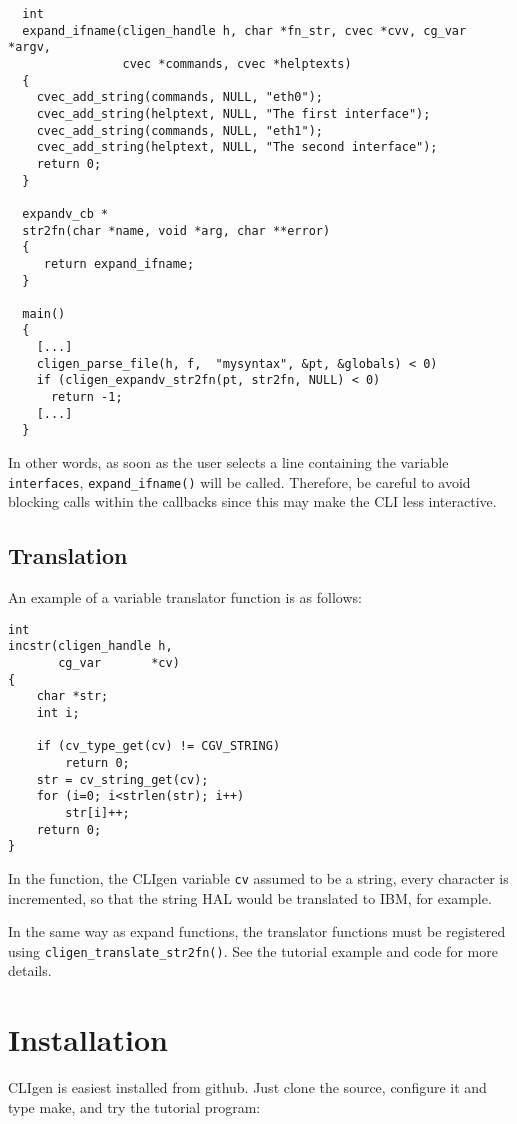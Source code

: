 \documentclass[a4paper, 10pt] {article}
\begin{document}
\begin{verbatim}
  int 
  expand_ifname(cligen_handle h, char *fn_str, cvec *cvv, cg_var *argv, 
                cvec *commands, cvec *helptexts)
  {
    cvec_add_string(commands, NULL, "eth0");
    cvec_add_string(helptext, NULL, "The first interface");
    cvec_add_string(commands, NULL, "eth1");
    cvec_add_string(helptext, NULL, "The second interface");
    return 0;
  }

  expandv_cb *
  str2fn(char *name, void *arg, char **error)
  {
     return expand_ifname;
  }

  main()
  {   
    [...]
    cligen_parse_file(h, f,  "mysyntax", &pt, &globals) < 0)
    if (cligen_expandv_str2fn(pt, str2fn, NULL) < 0)
      return -1;
    [...]
  }
\end{verbatim}

In other words, as soon as the user selects a line containing the
variable {\tt interfaces}, {\tt expand\_ifname()} will be
called. Therefore, be careful to avoid blocking calls within the
callbacks since this may make the CLI less interactive.

\subsection{Translation}
\label{sec:translate}

An example of a variable translator function is as follows:
\begin{verbatim}
int
incstr(cligen_handle h,
       cg_var       *cv)
{
    char *str;
    int i;
    
    if (cv_type_get(cv) != CGV_STRING)
        return 0;
    str = cv_string_get(cv);
    for (i=0; i<strlen(str); i++)
        str[i]++;
    return 0;
}
\end{verbatim}

In the function, the CLIgen variable {\tt cv} assumed to be a string, every character is incremented, so that the string HAL would be translated to IBM, for example.

In the same way as expand functions, the translator functions must be registered using {\tt cligen\_translate\_str2fn()}. See the tutorial example and code for more details.

\section{Installation}

CLIgen is easiest installed from github. Just clone the source,
configure it and type make, and try the tutorial program:
\end{document}
